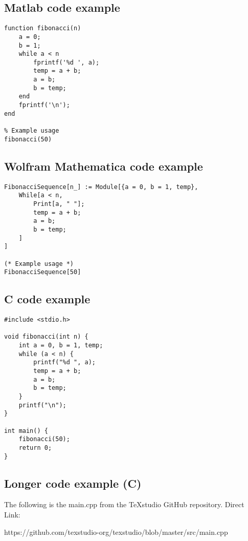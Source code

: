 \subsection{Matlab code example}
\begin{lstlisting}[style=matlabstyle]
function fibonacci(n)
    a = 0;
    b = 1;
    while a < n
        fprintf('%d ', a);
        temp = a + b;
        a = b;
        b = temp;
    end
    fprintf('\n');
end

% Example usage
fibonacci(50)
\end{lstlisting}


\subsection{Wolfram Mathematica code example}
\begin{lstlisting}[style=wolframstyle]
FibonacciSequence[n_] := Module[{a = 0, b = 1, temp},
    While[a < n,
        Print[a, " "];
        temp = a + b;
        a = b;
        b = temp;
    ]
]

(* Example usage *)
FibonacciSequence[50]

\end{lstlisting}


\subsection{C code example}
\begin{lstlisting}[style=cstyle]
#include <stdio.h>

void fibonacci(int n) {
    int a = 0, b = 1, temp;
    while (a < n) {
        printf("%d ", a);
        temp = a + b;
        a = b;
        b = temp;
    }
    printf("\n");
}

int main() {
    fibonacci(50);
    return 0;
}
\end{lstlisting}




\clearpage
\subsection{Longer code example (C)}

The following is the main.cpp from the TeXstudio GitHub repository. Direct Link:

https://github.com/texstudio-org/texstudio/blob/master/src/main.cpp

